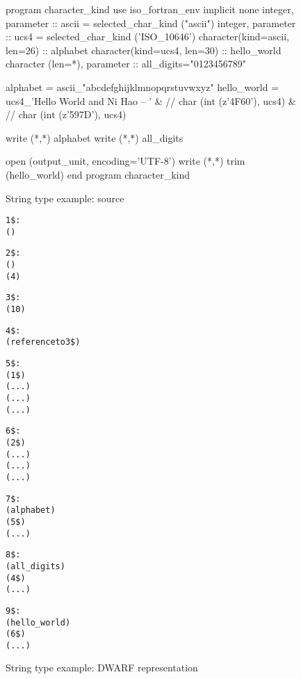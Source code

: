 \begin{figure}[ht]
\begin{nlnlisting}
        program character_kind
            use iso_fortran_env
            implicit none
            integer, parameter :: ascii = 
                selected_char_kind ("ascii")
            integer, parameter :: ucs4  = 
                selected_char_kind ('ISO_10646')
            character(kind=ascii, len=26) :: alphabet
            character(kind=ucs4,  len=30) :: hello_world
            character (len=*), parameter :: all_digits="0123456789"
              
            alphabet = ascii_"abcdefghijklmnopqrstuvwxyz"
            hello_world = ucs4_'Hello World and Ni Hao -- ' &
                          // char (int (z'4F60'), ucs4)     &
                          // char (int (z'597D'), ucs4)
              
            write (*,*) alphabet
            write (*,*) all_digits
              
            open (output_unit, encoding='UTF-8')
            write (*,*) trim (hello_world)
        end program character_kind
\end{nlnlisting}
\caption{String type example: source}
\label{fig:stringtypeexamplesource}
\end{figure}

\begin{figure}[ht]
\begin{dwflisting}
\begin{alltt}

1\$: \DWTAGbasetype
        \DWATencoding (\DWATEASCII)

2\$: \DWTAGbasetype
        \DWATencoding (\DWATEUCS)
        \DWATbytesize (4)

3\$: \DWTAGstringtype
        \DWATbytesize (10)

4\$: \DWTAGconsttype
        \DWATtype (reference to 3\$)
      
5\$: \DWTAGstringtype
        \DWATtype (1\$)
        \DWATstringlength ( ... )
        \DWATstringlengthbytesize ( ... )
        \DWATdatalocation ( ... )
      
6\$: \DWTAGstringtype
        \DWATtype (2\$)
        \DWATstringlength ( ... )
        \DWATstringlengthbytesize ( ... )
        \DWATdatalocation ( ... )

7\$: \DWTAGvariable
        \DWATname (alphabet)
        \DWATtype (5\$)
        \DWATlocation ( ... )

8\$: \DWTAGconstant
        \DWATname (all\_digits)
        \DWATtype (4\$)
        \DWATconstvalue ( ... )

9\$: \DWTAGvariable
        \DWATname (hello\_world)
        \DWATtype (6\$)
        \DWATlocation ( ... )
        
\end{alltt}
\end{dwflisting}
\caption{String type example: DWARF representation}
\label{fig:stringtypeexampledwarf}
\end{figure}

